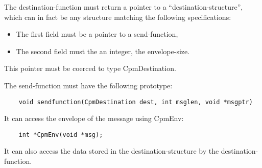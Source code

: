 The destination-function must return a pointer to a
``destination-structure'', which can in fact be any structure matching
the following specifications:

\begin{itemize}
\item{The first field must be a pointer to a send-function,}
\item{The second field must the an integer, the envelope-size.}
\end{itemize}

This pointer must be coerced to type CpmDestination.

The send-function must have the following prototype:

\begin{verbatim}
    void sendfunction(CpmDestination dest, int msglen, void *msgptr)
\end{verbatim}

It can access the envelope of the message using CpmEnv:

\begin{verbatim}
    int *CpmEnv(void *msg);
\end{verbatim}

It can also access the data stored in the destination-structure
by the destination-function.

